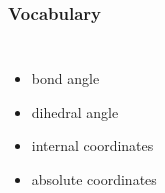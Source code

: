 \documentclass{beamer}
\begin{document}
\begin{frame}
\frametitle{Vocabulary}

\begin{columns}
\begin{itemize}[<+->]
	\item bond angle
	\item dihedral angle
	\item internal coordinates
	\item absolute coordinates
\end{itemize}
\end{columns}
\end{frame}
\end{document}
